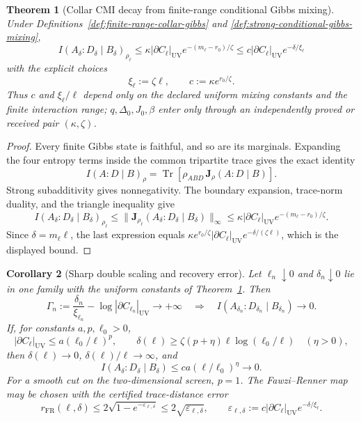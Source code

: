 \documentclass[11pt]{article}
\newtheorem{theorem}{Theorem}[section]
\newtheorem{corollary}[theorem]{Corollary}
\begin{document}
\begin{theorem}[Collar CMI decay from finite-range conditional Gibbs mixing]
\label{thm:collar-cmi-decay}
Under Definitions~\ref{def:finite-range-collar-gibbs} and
\ref{def:strong-conditional-gibbs-mixing},
\[
 \boxed{
 I(A_\delta:D_\delta\mid B_\delta)_{\rho_\ell}
 \le
 \kappa |\partial C_\ell|_{\mathrm{UV}}
 e^{-(m_\ell-r_0)/\zeta}
 \le
 c |\partial C_\ell|_{\mathrm{UV}}e^{-\delta/\xi_\ell}}
\]
with the explicit choices
\[
 \xi_\ell:=\zeta\ell,
 \qquad
 c:=\kappa e^{r_0/\zeta}.
\]
Thus \(c\) and \(\xi_\ell/\ell\) depend only on the declared uniform mixing constants and the
finite interaction range; \(q,\Delta_0,J_0,\beta\) enter only through an independently proved or
received pair \((\kappa,\zeta)\).
\end{theorem}

\begin{proof}
Every finite Gibbs state is faithful, and so are its marginals. Expanding the four entropy terms
inside the common tripartite trace gives the exact identity
\[
 I(A:D\mid B)_\rho
 =\operatorname{Tr}\!\left[\rho_{ABD}\,
 \mathbf J_\rho(A:D\mid B)\right].
\]
Strong subadditivity gives nonnegativity. The boundary expansion, trace-norm duality, and the
triangle inequality give
\[
 I(A_\delta:D_\delta\mid B_\delta)_{\rho_\ell}
 \le
 \|\mathbf J_{\rho_\ell}(A_\delta:D_\delta\mid B_\delta)\|_\infty
 \le
 \kappa |\partial C_\ell|_{\mathrm{UV}}
 e^{-(m_\ell-r_0)/\zeta}.
\]
Since \(\delta=m_\ell\ell\), the last expression equals
\(\kappa e^{r_0/\zeta}|\partial C_\ell|_{\mathrm{UV}}
e^{-\delta/(\zeta\ell)}\), which is the displayed bound.
\end{proof}

\begin{corollary}[Sharp double scaling and recovery error]\label{cor:collar-cmi-double-scaling}
Let \(\ell_n\downarrow0\) and \(\delta_n\downarrow0\) lie in one family with the uniform constants
of Theorem~\ref{thm:collar-cmi-decay}. Then
\[
 \Gamma_n
 :=\frac{\delta_n}{\xi_{\ell_n}}
 -\log|\partial C_{\ell_n}|_{\mathrm{UV}}
 \longrightarrow+\infty
 \quad\Longrightarrow\quad
 I(A_{\delta_n}:D_{\delta_n}\mid B_{\delta_n})\longrightarrow0.
\]
If, for constants \(a,p,\ell_0>0\),
\[
 |\partial C_\ell|_{\mathrm{UV}}
 \le a(\ell_0/\ell)^p,
 \qquad
 \delta(\ell)\ge
 \zeta(p+\eta)\ell\log(\ell_0/\ell)
 \quad(\eta>0),
\]
then \(\delta(\ell)\to0\), \(\delta(\ell)/\ell\to\infty\), and
\[
 I(A_\delta:D_\delta\mid B_\delta)
 \le ca(\ell/\ell_0)^\eta\longrightarrow0.
\]
For a smooth cut on the two-dimensional screen, \(p=1\). The Fawzi--Renner map may be chosen with
the certified trace-distance error
\[
 r_{\mathrm{FR}}(\ell,\delta)
 \le 2\sqrt{1-e^{-\varepsilon_{\ell,\delta}}}
 \le2\sqrt{\varepsilon_{\ell,\delta}},
 \qquad
 \varepsilon_{\ell,\delta}:=
 c|\partial C_\ell|_{\mathrm{UV}}e^{-\delta/\xi_\ell}.
\]
\end{corollary}
\end{document}
